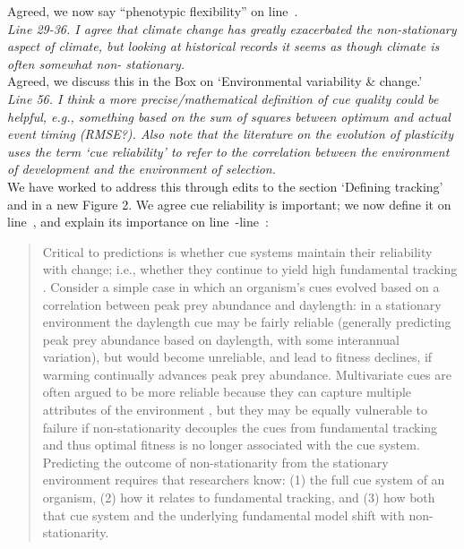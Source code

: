 \documentclass[11pt]{article}
\newcommand{\lr}[1]{line~\lineref{#1}}
\begin{document}
Agreed, we now say ``phenotypic flexibility'' on \lr{r4misc2}.\\

\emph{Line 29-36. I agree that climate change has greatly exacerbated the non-stationary aspect of
climate, but looking at historical records it seems as though climate is often somewhat non-
stationary.}\\

Agreed, we discuss this in the Box on `Environmental variability \& change.'\\

\emph{Line 56. I think a more precise/mathematical definition of cue quality could be helpful, e.g., something based on the sum of squares between optimum and actual event timing (RMSE?). Also note that the literature on the evolution of plasticity uses the term `cue reliability'
to refer to the correlation between the environment of development and the environment of
selection.}\\

We have worked to address this through edits to the section `Defining tracking' and in a new Figure 2. We agree cue reliability is important; we now define it on \lr{definecue}, and explain its importance on \lr{cuereliable}-\lr{r3birdsE}:
\begin{quote}
Critical to predictions is whether  cue systems maintain their reliability with change; i.e., whether they continue to yield high fundamental tracking \citep{bonamour2019}. Consider a simple case in which an organism's cues evolved based on a correlation between peak prey abundance and daylength: in a stationary environment the daylength cue may be fairly reliable (generally predicting peak prey abundance based on daylength, with some interannual variation), but would become unreliable, and lead to fitness declines, if warming continually advances peak prey abundance. Multivariate cues are often argued to be more reliable because they can capture multiple attributes of the environment \citep{dore2018,bonamour2019}, but they may be equally vulnerable to failure if non-stationarity decouples the cues from fundamental tracking \citep{bonamour2019} and thus optimal fitness is no longer associated with the cue system. Predicting the outcome of non-stationarity from the stationary environment requires that researchers know: (1) the full cue system of an organism, (2) how it relates to fundamental tracking, and (3) how both that cue system and the underlying fundamental model shift with non-stationarity.
\end{quote}
\end{document}

